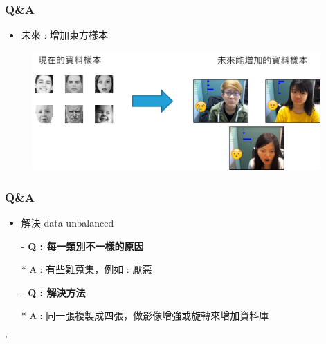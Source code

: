 \documentclass[10pt, conference, compsocconf]{beamer}
\begin{document}
\begin{CJK}{UTF8}{}
\begin{frame}
\frametitle{Q\&A}
\begin{itemize}
\item\Large 未來 : 增加東方樣本
\end{itemize}
\begin{figure}[t]
\begin{center}
\includegraphics[width=11cm]{./Figures/8.png}
\end{center}
\end{figure}
\end{frame}

\begin{frame}
\frametitle{Q\&A}
\begin{itemize}
\item\Large 解決 data unbalanced
\end{itemize}
\begin{itemize}
\item[-] \large\bf Q : 每一類別不一樣的原因
\item[*] A : 有些難蒐集，例如 : 厭惡
\vspace{5mm}
\item[-] \large\bf Q : 解決方法
\item[*] A : 同一張複製成四張，做影像增強或旋轉來增加資料庫
\end{itemize}
\end{frame}
'


\end{CJK}
\end{document}
